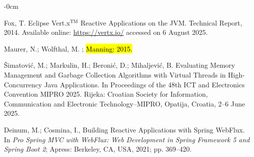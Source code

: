 \documentclass[software,article,accept,pdftex,moreauthors]{Definitions/mdpi}
\begin{document}
\begin{adjustwidth}{-\extralength}{0cm}
\begin{thebibliography}{999}
Fox, T.
\newblock Eclipse Vert.x$^{\text{TM}}$ Reactive Applications on the JVM.
\newblock Technical Report, 2014. Available online: \url{https://vertx.io/} accessed on 6 August 2025.

Maurer, N.; Wolfthal, M.
; \hl{Manning: 2015.} %


{\v{S}}imatovi{\'c}, M.; Markulin, H.; Beroni{\'c}, D.; Mihaljevi{\'c}, B.
\newblock Evaluating Memory Management and Garbage Collection Algorithms with
  Virtual Threads in High-Concurrency Java Applications.
\newblock In Proceedings of the 48th ICT and Electronics Convention MIPRO 2025. Rijeka: Croatian Society for Information, Communication and Electronic Technology–MIPRO, Opatija, Croatia, 2--6 June 2025. %


Deinum, M.; Cosmina, I., Building Reactive Applications with Spring WebFlux.
\newblock In {\em Pro Spring MVC with WebFlux: Web Development in Spring
  Framework 5 and Spring Boot 2}; Apress: Berkeley, CA, USA, 2021; pp. 369--420.

\end{thebibliography}



	\PublishersNote{}
\end{adjustwidth}
\end{document}
